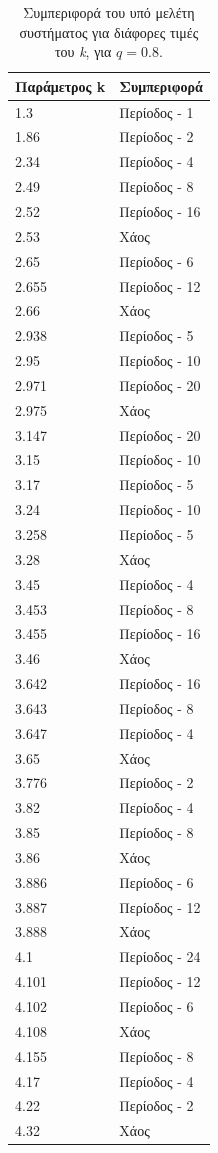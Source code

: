 \begin{table}[ht]
	\centering
	\caption{ Συμπεριφορά του υπό μελέτη συστήματος για διάφορες τιμές του \emph{k}, για $q=0.8$. }
	\label{tab:abc12}
	\begin{tabular}{l | l}
		Παράμετρος k & Συμπεριφορά \\
		\hline
		1.3 &  Περίοδος -  1 \\
		1.86 &  Περίοδος -  2 \\
		2.34& Περίοδος -  4 \\
		2.49& Περίοδος -  8 \\
		2.52& Περίοδος -  16 \\
		2.53 & Xάος \\
		2.65& Περίοδος - 6 \\
		2.655& Περίοδος - 12\\
		2.66& Χάος \\
		2.938& Περίοδος - 5 \\
		2.95 &  Περίοδος - 10  \\
		2.971 &  Περίοδος -  20 \\
		2.975 &  Χάος \\
		3.147& Περίοδος - 20 \\
		3.15 &  Περίοδος - 10  \\
		3.17 &  Περίοδος -  5 \\
		3.24 &Περίοδος - 10 \\
		3.258 &  Περίοδος -  5\\
		3.28 &Χάος \\
		3.45 & Περίοδος - 4\\
		3.453& Περίοδος - 8\\
		3.455& Περίοδος - 16\\
		3.46& Xάος\\
		3.642& Περίοδος - 16\\
		3.643 & Περίοδος - 8\\
		3.647& Περίοδος - 4\\
		3.65 & Χάος\\
		3.776 & Περίοδος -  2\\
		3.82 & Περίοδος -  4\\
		3.85 & Περίοδος -  8\\
		3.86 & Xάος\\
		3.886 & Περίοδος -  6\\
		3.887 & Περίοδος -  12\\
		3.888 & Χάος\\
		4.1& Περίοδος -  24\\
		4.101& Περίοδος -  12\\
		4.102 & Περίοδος -  6\\
		4.108 & Χάος\\
		4.155 & Περίοδος -  8\\
		4.17 & Περίοδος -  4\\
		4.22 & Περίοδος -  2\\
		4.32 &  Χάος\\
		
	\end{tabular}
	
\end{table}

